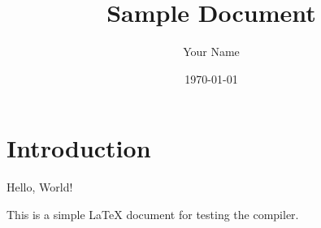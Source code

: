 \documentclass{article}
\title{Sample Document}
\author{Your Name}
\date{\today}
\begin{document}
\maketitle

\section{Introduction}

Hello, World!

This is a simple LaTeX document for testing the compiler.
\end{document}
